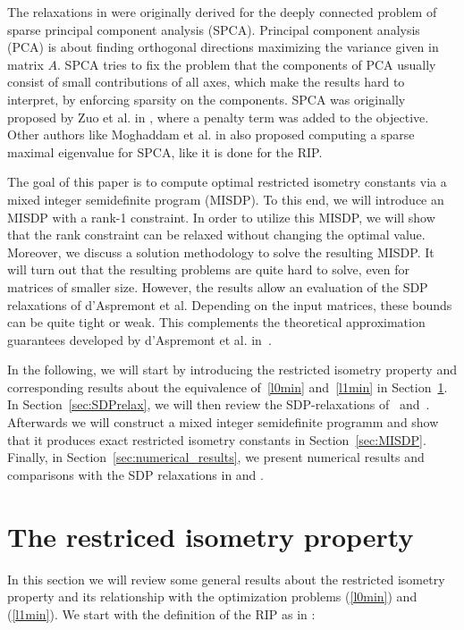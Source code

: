 \documentclass[journal]{IEEEtran}
\begin{document}
The relaxations in \cite{Asp07,Asp08} were originally derived for the deeply
connected problem of sparse principal component analysis (SPCA). Principal
component analysis (PCA) is about finding orthogonal directions maximizing the 
variance given in matrix $A$. SPCA tries to fix the problem that the components
of PCA usually consist of small contributions of all axes, which make the results
hard to interpret, by enforcing sparsity on the components. SPCA was
originally proposed by Zuo et al. in \cite{SPCA}, where a penalty term was added 
to the objective. Other authors like Moghaddam et al. in \cite{sbSPCA} also proposed 
computing a sparse maximal eigenvalue for SPCA, like it is done for the RIP.

The goal of this paper is to compute optimal restricted isometry constants
via a mixed integer semidefinite program (MISDP). To this end, we will
introduce an MISDP with a rank-1 constraint. In order to
utilize this MISDP, we will show that the rank constraint can be relaxed
without changing the optimal value. Moreover, we discuss a solution
methodology to solve the resulting MISDP. It will turn out that
the resulting problems are quite hard to solve, even for matrices of
smaller size. However, the results allow an evaluation of the SDP
relaxations of d'Aspremont et al. Depending on the input matrices, these
bounds can be quite tight or weak. This complements the theoretical
approximation guarantees developed by d'Aspremont et
al. in~\cite{AspBG14}.

In the following, we will start by introducing the restricted isometry
property and corresponding results about the equivalence of~\eqref{l0min}
and~\eqref{l1min} in Section~\ref{sec:RIP}. In Section~\ref{sec:SDPrelax},
we will then review the SDP-relaxations of~\cite{Asp07}
and~\cite{Asp08}. Afterwards we will construct a mixed integer semidefinite
programm and show that it produces exact restricted isometry constants in
Section~\ref{sec:MISDP}. Finally, in Section~\ref{sec:numerical_results},
we present numerical results and comparisons with the SDP relaxations in
\cite{Asp07} and \cite{Asp08}.

\section{The restriced isometry property}
\label{sec:RIP}

In this section we will review some general results about the restricted
isometry property and its relationship with the optimization problems
(\ref{l0min}) and (\ref{l1min}). We start with the definition of the RIP as
in \cite{CT05}:
\end{document}
